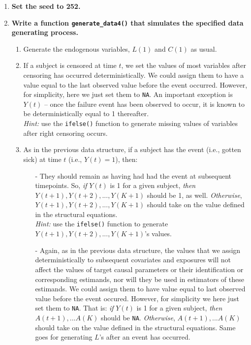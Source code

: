\documentclass[answers]{exam}
\begin{document}
\begin{enumerate}
\item \textbf{Set the seed to 252.}
\item \textbf{Write a function \texttt{generate\_data4()} that simulates the specified data generating process.}
\begin{enumerate}
\item Generate the endogenous variables, $L(1)$ and $C(1)$ as usual. \\
\item If a subject is censored at time $t$, we set the values of most variables after censoring has occurred deterministically. We could assign them to have a value equal to the last observed value before the event occurred. However, for simplicity, here we just set them to \texttt{NA}. An important exception is $Y(t)$ -- once the failure event has been observed to occur, it is known to be deterministically equal to 1 thereafter. \\
\emph{Hint:} use the \texttt{ifelse()} function to generate missing values of variables after right censoring occurs. 
\item As in the previous data structure, if a subject has the event (i.e., gotten sick) at time $t$ (i.e., $Y(t) = 1$), then:
\begin{itemize}
\item[-] They should remain as having had had the event at subsequent timepoints. So, \textit{if} $Y(t)$ is 1 for a given subject, \textit{then} $Y(t+1), Y(t+2), ... , Y(K+1)$ should be 1, as well. \textit{Otherwise}, $Y(t+1), Y(t+2), ... , Y(K+1)$ should take on the value defined in the structural equations. \\
\emph{Hint:} use the \texttt{ifelse()} function to generate $Y(t+1), Y(t+2), ... , Y(K+1)$'s values.
\item[-] Again, as in the previous data structure, the values that we assign deterministically to subsequent covariates and exposures  will not affect the values of target causal parameters or their identification or corresponding estimands, nor will they be used in estimators of these estimands. We could assign them to have value equal to last observed value before the event occured. However, for simplicity we here just set them to \texttt{NA}. That is: \textit{if} $Y(t)$ is 1 for a given subject,  \textit{then} $A(t+1), ... A(K)$ should be \texttt{NA}. \textit{Otherwise}, $A(t+1), ... A(K)$ should take on the value defined in the structural equations. Same goes for generating $L$'s after an event has occurred. \\

\end{itemize}
\end{enumerate}
\end{enumerate}
\end{document}
